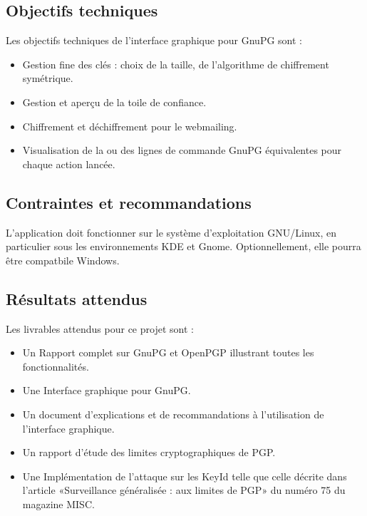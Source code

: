 \documentclass{../res/univ-projet}
\begin{document}
\subsection{Objectifs techniques}

Les objectifs techniques de l'interface graphique pour GnuPG sont :
\begin{itemize}
 \item Gestion fine des clés : choix de la taille, de l'algorithme de chiffrement symétrique.
 \item Gestion et aperçu de la toile de confiance.
 \item Chiffrement et déchiffrement pour le webmailing.
 \item Visualisation de la ou des lignes de commande GnuPG équivalentes pour chaque action lancée.
\end{itemize}

\subsection{Contraintes et recommandations}
L'application doit fonctionner sur le système d'exploitation GNU/Linux, en particulier sous les environnements KDE et Gnome. Optionnellement, 
elle pourra être compatbile Windows.

\subsection{Résultats attendus}
Les livrables attendus pour ce projet sont :
\begin{itemize}
 \item Un Rapport complet sur GnuPG et OpenPGP illustrant toutes les fonctionnalités.
 \item Une Interface graphique pour GnuPG.
 \item Un document d'explications et de recommandations à l'utilisation de l'interface graphique.
 \item Un rapport d'étude des limites cryptographiques de PGP.
 \item Une Implémentation de l'attaque sur les KeyId telle que celle décrite dans l'article «Surveillance généralisée : aux limites de PGP» du 
	numéro 75 du magazine MISC.
\end{itemize}
\end{document}
